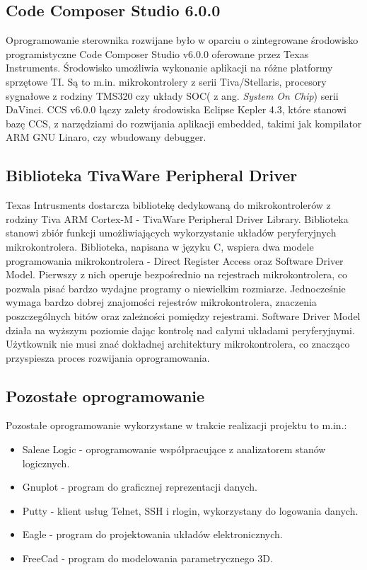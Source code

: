 \subsection{Code Composer Studio 6.0.0}

Oprogramowanie sterownika rozwijane było w oparciu o zintegrowane środowisko programistyczne Code Composer Studio v6.0.0 oferowane przez Texas Instruments. Środowisko umożliwia wykonanie aplikacji na różne platformy sprzętowe TI. Są to m.in. mikrokontrolery z serii Tiva/Stellaris, procesory sygnałowe z rodziny TMS320 czy układy SOC( z ang. {\em System On Chip}) serii DaVinci. CCS v6.0.0 łączy zalety środowiska Eclipse Kepler 4.3, które stanowi bazę CCS, z narzędziami do rozwijania aplikacji embedded, takimi jak kompilator ARM GNU Linaro, czy wbudowany debugger.
\subsection{Biblioteka TivaWare Peripheral Driver}
Texas Intrusments dostarcza bibliotekę dedykowaną do mikrokontrolerów z rodziny Tiva ARM Cortex-M - TivaWare  Peripheral Driver Library. Biblioteka stanowi zbiór funkcji umożliwiających wykorzystanie układów peryferyjnych mikrokontrolera. Biblioteka, napisana w języku C, wspiera dwa modele programowania mikrokontrolera - Direct Register Access oraz Software Driver Model. Pierwszy z nich operuje bezpośrednio na rejestrach mikrokontrolera, co pozwala pisać bardzo wydajne programy o niewielkim rozmiarze. Jednocześnie wymaga bardzo dobrej znajomości rejestrów mikrokontrolera, znaczenia poszczególnych bitów oraz zależności pomiędzy rejestrami. Software Driver Model działa na wyższym poziomie dając kontrolę nad całymi układami peryferyjnymi. Użytkownik nie musi znać dokładnej architektury mikrokontrolera, co znacząco przyspiesza proces rozwijania oprogramowania. 
\subsection{Pozostałe oprogramowanie}
Pozostałe oprogramowanie wykorzystane w trakcie realizacji projektu to m.in.:
\begin{itemize}
\item
Saleae Logic - oprogramowanie współpracujące z analizatorem stanów logicznych.
\item
Gnuplot - program do graficznej reprezentacji danych.
\item
Putty - klient usług Telnet, SSH i rlogin, wykorzystany do logowania danych.
\item
Eagle - program do projektowania układów elektronicznych.
\item
FreeCad - program do modelowania parametrycznego 3D.
\end{itemize}



